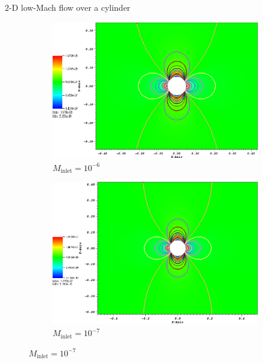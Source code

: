 \documentclass[xcolor=dvipsnames,10pt]{beamer}
\begin{document}
\begin{frame}{$2$-D low-Mach flow over a cylinder}
\begin{figure}
        \begin{subfigure}[b]{0.37\textwidth}
                \centering
                \includegraphics[width=\textwidth]{../figures/CylinderMach1em6ZoomIn.png}
                \caption{$M_{\text{inlet}}=10^{-6}$}
        \end{subfigure}%
        \begin{subfigure}[b]{0.37\textwidth}
                \centering
                \includegraphics[width=\textwidth]{../figures/CylinderMach1em7ZoomIn.png}
                \caption{$M_{\text{inlet}}=10^{-7}$}
        \end{subfigure}    
\end{figure}        
\end{frame}
\end{document}
